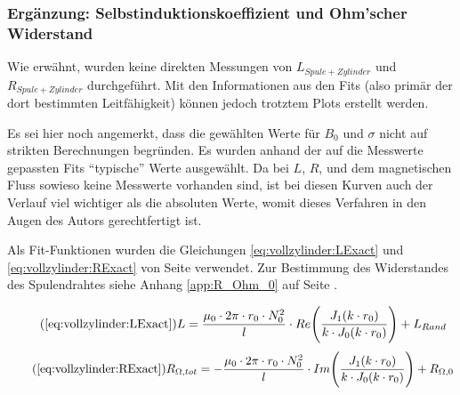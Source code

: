 {    \subsubsection{Erg\"anzung: Selbstinduktionskoeffizient und Ohm'scher Widerstand}
    \label{sec:ausw:subsec:vollz:subsubsec:LR}

	\begin{minipage}[t]{0.33\textwidth}
        \vspace{0mm}
        Wie  erw\"ahnt,  wurden  keine  direkten  Messungen  von  $L_{Spule  +
        Zylinder}$   und  $R_{Spule   +  Zylinder}$   durchgef\"uhrt. Mit  den
        Informationen  aus  den  Fits   (also  prim\"ar  der  dort  bestimmten
        Leitf\"ahigkeit) k\"onnen jedoch trotztem Plots erstellt werden.

        Es sei  hier noch  angemerkt, dass die  gew\"ahlten Werte  f\"ur $B_0$
        und $\sigma$  nicht auf  strikten Berechnungen  begr\"unden. Es wurden
        anhand  der  auf  die  Messwerte  gepassten  Fits  ``typische''  Werte
        ausgew\"ahlt. Da  bei $L$,  $R$,  und dem  magnetischen Fluss  sowieso
        keine Messwerte vorhanden sind, ist bei diesen Kurven auch der Verlauf
        viel wichtiger als die absoluten  Werte, womit dieses Verfahren in den
        Augen des Autors gerechtfertigt ist.

        Als        Fit-Funktionen         wurden        die        Gleichungen
        \ref{eq:vollzylinder:LExact}   und  \ref{eq:vollzylinder:RExact}   von
        Seite  \pageref{eq:vollzylinder:LExact} verwendet. Zur  Bestimmung des
        Widerstandes  des  Spulendrahtes  siehe Anhang  \ref{app:R_Ohm_0}  auf
        Seite \pageref{app:R_Ohm_0}.

        \begin{equation}
            \tag{\ref{eq:vollzylinder:LExact}}
            L = \frac{\mu_0 \cdot 2\pi \cdot r_0 \cdot N_0^2}{l} \cdot Re \Biggl(\frac{J_1 (k \cdot r_0)}{k \cdot J_0 (k \cdot r_0)} \Biggr) + L_{Rand}
        \end{equation}
        \begin{equation}
            \tag{\ref{eq:vollzylinder:RExact}}
            R_{\Omega,tot} = - \frac{\mu_0 \cdot 2\pi \cdot r_0 \cdot N_0^2}{l} \cdot Im \Biggl(\frac{J_1 (k \cdot r_0)}{k \cdot J_0 (k \cdot r_0)} \Biggr) + R_{\Omega,0}
        \end{equation}


\end{minipage}}
